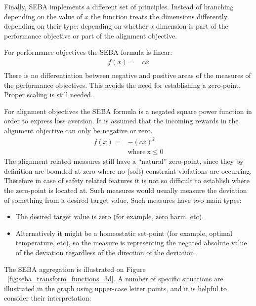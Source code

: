 Finally, SEBA implements a different set of principles. Instead of branching depending on the value of $x$ the function treats the dimensions differently depending on their type: depending on whether a dimension is part of the performance objective or part of the alignment objective.%

For performance objectives the SEBA formula is linear:
\begin{align}
f(x)= &  cx \\ \nonumber
\end{align}
There is no differentiation between negative and positive areas of the measures of the performance objectives. This avoids the need for establishing a zero-point. Proper scaling is still needed.

For alignment objectives the SEBA formula is a negated square power function in order to express loss aversion. It is assumed that the incoming rewards in the alignment objective can only be negative or zero.
\begin{align}
\label{eq:seba}
f(x)= &  -(cx)^2 \\ \nonumber
  &  \mathrm{ where \: x \leq 0}
\end{align}
The alignment related measures still have a “natural” zero-point, since they by definition are bounded at zero where no (soft) constraint violations are occurring. Therefore in case of safety related features it is not so difficult to establish where the zero-point is located at. Such measures would usually measure the deviation of something from a desired target value. Such measures have two main types:
\begin{itemize}
    \item The desired target value is zero (for example, zero harm, etc).
    \item Alternatively it might be a homeostatic set-point (for example, optimal temperature, etc), so the measure is representing the negated absolute value of the deviation regardless of the direction of the deviation.
\end{itemize}
The SEBA aggregation is illustrated on Figure ~\ref{fig:seba_transform_functions_3d}. A number of specific situations are illustrated in the graph using upper-case letter points, and it is helpful to consider their interpretation:
